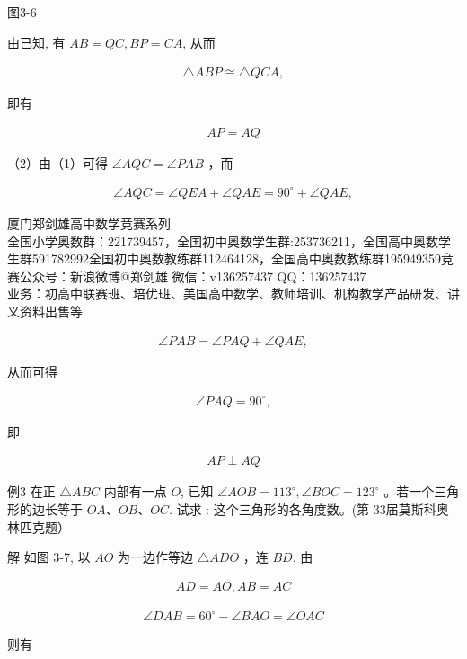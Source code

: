 \documentclass[10pt]{article}
\begin{document}
图3-6

由已知, 有 $A B=Q C, B P=C A$, 从而

\begin{align*}
\triangle A B P \cong \triangle Q C A,
\end{align*}

即有

\begin{align*}
A P=A Q
\end{align*}

（2）由（1）可得 $\angle A Q C=\angle P A B$ ，而

\begin{align*}
\angle A Q C=\angle Q E A+\angle Q A E=90^{\circ}+\angle Q A E,
\end{align*}

厦门郑剑雄高中数学竞赛系列\\
全国小学奥数群：221739457，全国初中奥数学生群:253736211，全国高中奥数学生群591782992全国初中奥数教练群112464128，全国高中奥数教练群195949359竞赛公众号：新浪微博@郑剑雄 微信：v136257437 QQ：136257437\\
业务：初高中联赛班、培优班、美国高中数学、教师培训、机构教学产品研发、讲义资料出售等

\begin{align*}
\angle P A B=\angle P A Q+\angle Q A E,
\end{align*}

从而可得

\begin{align*}
\angle P A Q=90^{\circ},
\end{align*}

即

\begin{align*}
A P \perp A Q
\end{align*}

例3 在正 $\triangle A B C$ 内部有一点 $O$, 已知 $\angle A O B=113^{\circ}, \angle B O C=123^{\circ}$ 。若一个三角形的边长等于 $O A 、 O B 、 O C$. 试求 : 这个三角形的各角度数。(第 33届莫斯科奥林匹克题）

解 如图 3-7, 以 $A O$ 为一边作等边 $\triangle A D O$ ，连 $B D$. 由

\begin{align*}
A D=A O, A B=A C
\end{align*}

\begin{align*}
\angle D A B=60^{\circ}-\angle B A O=\angle O A C
\end{align*}

则有
\end{document}
